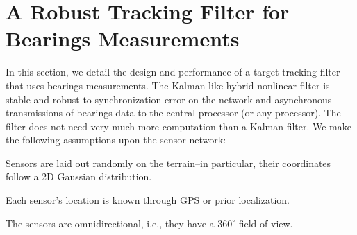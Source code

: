 \section{A Robust Tracking Filter for Bearings Measurements}
In this section, we detail the design and performance of a target tracking filter that uses bearings measurements. The Kalman-like hybrid nonlinear filter is stable and robust to synchronization error on the network and asynchronous transmissions of bearings data to the central processor (or any processor). The filter does not need very much more computation than a Kalman filter. We make the following assumptions upon the sensor network:

\begin{assumption}
Sensors are laid out randomly on the terrain--in particular, their coordinates follow a 2D Gaussian distribution.
\end{assumption}
\begin{assumption}
Each sensor's location is known through GPS or prior localization.
\end{assumption}
\begin{assumption}
The sensors are omnidirectional, i.e., they have a $360^\circ$ field of view.
\end{assumption}

